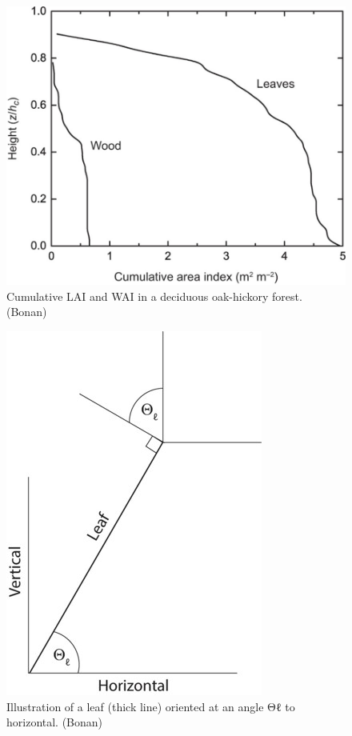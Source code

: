 \documentclass[12pt,oneside]{book}
\begin{document}
\begin{figure}

{\centering \includegraphics[width=0.8\linewidth]{figures/chap3/f32_cLAI} 

}

\caption{Cumulative LAI and WAI in a deciduous oak-hickory forest. (Bonan)}\label{fig:f32}
\end{figure}\begin{figure}

{\centering \includegraphics[width=0.8\linewidth]{figures/chap3/f33_Langle} 

}

\caption{Illustration of a leaf (thick line) oriented at an angle Θℓ to horizontal. (Bonan)}\label{fig:f33}
\end{figure}
\end{document}

